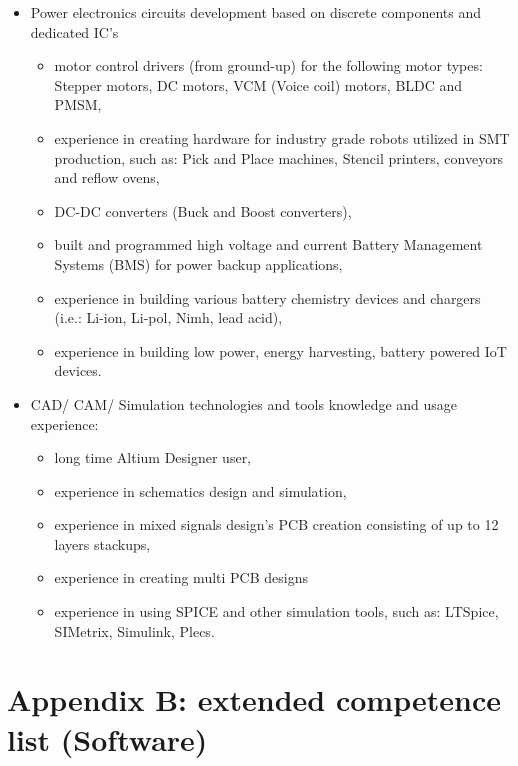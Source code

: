 \documentclass{tccv}
\begin{document}
\begin{itemize}
	\item Power electronics circuits development based on discrete components and dedicated IC's
	\begin{itemize}
		\item motor control drivers (from ground-up) for the following motor types: Stepper motors, DC motors, VCM (Voice coil) motors, BLDC and PMSM,
		\item experience in creating hardware for industry grade robots utilized in SMT production, such as: Pick and Place machines, Stencil printers, conveyors and reflow ovens,
	\item DC-DC converters (Buck and Boost converters),
	\item built and programmed high voltage and current Battery Management Systems (BMS) for power backup applications,
	\item experience in building various battery chemistry devices and chargers (i.e.: Li-ion, Li-pol, Nimh, lead acid), 
	\item experience in building low power, energy harvesting, battery powered IoT devices.
	\end{itemize}
\end{itemize}

\begin{itemize}
	\item CAD/ CAM/ Simulation technologies and tools knowledge and usage experience:
	\begin{itemize}
		\item long time Altium Designer user,
		\item experience in schematics design and simulation,
		\item experience in mixed signals design's PCB creation consisting of up to 12 layers stackups,
		\item experience in creating multi PCB designs
		\item experience in using SPICE and other simulation tools, such as: LTSpice, SIMetrix, Simulink, Plecs.
	\end{itemize}
\end{itemize}
     
\clearpage

\section{Appendix B: extended competence list (Software)}
\end{document}
